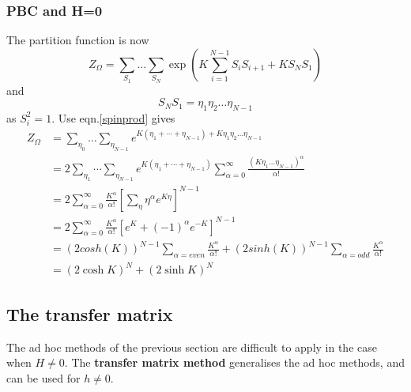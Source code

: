 \documentclass[12pt,titlepage]{article}
\numberwithin{equation}{section}
\begin{document}
\subsubsection{PBC and H=0}
The partition function is now
\begin{equation}
Z_{\Omega}=\sum_{S_{1}} \ldots \sum_{S_{N}} \exp \left(K \sum_{i=1}^{N-1} S_{i} S_{i+1}+K S_{N} S_{1}\right)
\end{equation}
and
\begin{equation}
\label{spinprod}
S_{N} S_{1}=\eta_{1} \eta_{2} \dots \eta_{N-1}
\end{equation}
as $S^2_i=1$. Use eqn.\ref{spinprod} gives
\begin{equation}
\begin{aligned} Z_{\Omega} &=\sum_{\eta_{0}} \ldots \sum_{\eta_{N-1}} e^{K\left(\eta_{1}+\cdots+\eta_{N-1}\right)+K \eta_{1} \eta_{2} \ldots \eta_{N-1}} \\ &=2 \sum_{\eta_{1}} \cdots \sum_{\eta_{N-1}} e^{K\left(\eta_{1}+\cdots+\eta_{N-1}\right)} \sum_{\alpha=0}^{\infty} \frac{\left(K \eta_{1} \ldots \eta_{N-1}\right)^{\alpha}}{\alpha !} \\ &=2 \sum_{\alpha=0}^{\infty} \frac{K^{\alpha}}{\alpha !}\left[\sum_{\eta} \eta^{\alpha} e^{K \eta}\right]^{N-1} \\ &=2 \sum_{\alpha=0}^{\infty} \frac{K^{\alpha}}{\alpha !}\left[e^{K}+(-1)^{\alpha} e^{-K}\right]^{N-1} \\ &=(2cosh(K))^{N-1}\sum_{\alpha=even}\frac{K^{\alpha}}{\alpha !}+ (2sinh(K))^{N-1}\sum_{\alpha=odd}\frac{K^{\alpha}}{\alpha !} \\ &=(2 \cosh K)^{N}+(2 \sinh K)^{N} \end{aligned}
\end{equation}

\subsection{The transfer matrix}
The ad hoc methods of the previous section are difficult to apply in the case when $H \neq 0$. The \textbf{transfer matrix method} generalises the ad hoc methods, and can be used for $h \neq 0$.
\end{document}
